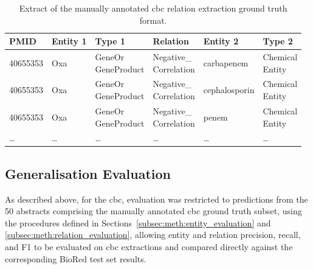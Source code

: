 \begin{table}[H]
    \centering
    \caption{Extract of the manually annotated \gls{cbc} relation extraction ground truth format.}
    \label{tab:cbc_manual_re}

    \begin{tabularx}{\textwidth}{l l X X l X}
        \toprule
        PMID & Entity 1 & Type 1 & Relation & Entity 2 & Type 2 \\
        \midrule
        40655353 & Oxa &
        \makecell[l]{GeneOr\\GeneProduct} &
        \makecell[l]{Negative\_\\Correlation} &
        carbapenem &
        \makecell[l]{Chemical\\Entity} \\

        40655353 & Oxa &
        \makecell[l]{GeneOr\\GeneProduct} &
        \makecell[l]{Negative\_\\Correlation} &
        cephalosporin &
        \makecell[l]{Chemical\\Entity} \\

        40655353 & Oxa &
        \makecell[l]{GeneOr\\GeneProduct} &
        \makecell[l]{Negative\_\\Correlation} &
        penem &
        \makecell[l]{Chemical\\Entity} \\

        \ldots & \ldots & \ldots & \ldots & \ldots & \ldots \\
        \bottomrule
    \end{tabularx}
\end{table}

\subsection{Generalisation Evaluation}
\label{subsec:meth:generalisation_evaluation}
As described above, for the \gls{cbc}, evaluation was restricted to predictions from the 50 abstracts comprising the manually annotated \gls{cbc} ground truth subset, using the procedures defined in Sections~\ref{subsec:meth:entity_evaluation} and \ref{subsec:meth:relation_evaluation}, allowing entity and relation precision, recall, and F1 to be evaluated on \gls{cbc} extractions and compared directly against the corresponding BioRed test set results.

